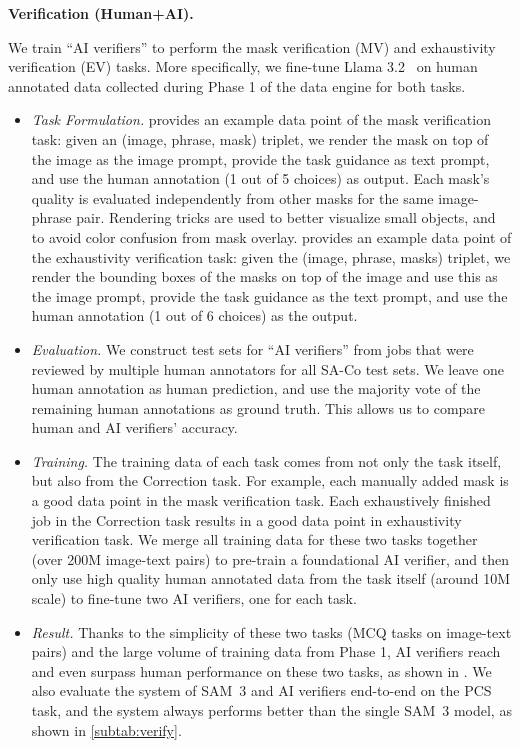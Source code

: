 \documentclass[]{fairmeta}
\newcommand{\model}{SAM~3\xspace}
\newcommand{\dsname}{{SA-Co}\xspace}
\renewcommand{\paragraph}[1]{%
	\noindent\textbf{#1.}\noindent\xspace%
}
\begin{document}
\paragraph{Verification (Human+AI)}
\label{sec:ai_verifiers}
We train ``AI verifiers'' to perform the mask verification (MV) and exhaustivity verification (EV) tasks. More specifically, we fine-tune Llama 3.2~\cite{llama3} on human annotated data collected during Phase 1 of the data engine for both tasks. 
\begin{itemize}
	\item \textit{Task Formulation.}  provides an example data point of the mask verification task: given an (image, phrase, mask) triplet, we render the mask on top of the image as the image prompt, provide the task guidance as text prompt, and use the human annotation (1 out of 5 choices) as output. Each mask’s quality is evaluated independently from other masks for the same image-phrase pair. Rendering tricks are used to better visualize small objects, and to avoid color confusion from mask overlay.  provides an example data point of the exhaustivity verification task: given the (image, phrase, masks) triplet, we render the bounding boxes of the masks on top of the image and use this as the image prompt, provide the task guidance as the text prompt, and use the human annotation (1 out of 6 choices) as the output.
	\item \textit{Evaluation.} We construct test sets for ``AI verifiers'' from jobs that were reviewed by multiple human annotators for all \dsname test sets. We leave one human annotation as human prediction, and use the majority vote of the remaining human annotations as ground truth. This allows us to compare human and AI verifiers' accuracy.
	\item \textit{Training.} The training data of each task comes from not only the task itself, but also from the Correction task. For example, each manually added mask is a good data point in the mask verification task. Each exhaustively finished job in the Correction task results in a good data point in exhaustivity verification task. We merge all training data for these two tasks together (over 200M image-text pairs) to pre-train a foundational AI verifier, and then only use high quality human annotated data from the task itself (around 10M scale) to fine-tune two AI verifiers, one for each task. 
	\item \textit{Result.} Thanks to the simplicity of these two tasks (MCQ tasks on image-text pairs) and the large volume of training data from Phase 1, AI verifiers reach and even surpass human performance on these two tasks, as shown in . We also evaluate the system of \model and AI verifiers end-to-end on the PCS task, and the system always performs better than the single \model model, as shown in \cref{subtab:verify}.

\end{itemize}
\end{document}
